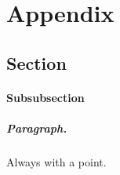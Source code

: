 \chapter{Appendix}
\section{Section}
%
\subsubsection{Subsubsection}

\paragraph{Paragraph.} Always with a point.
